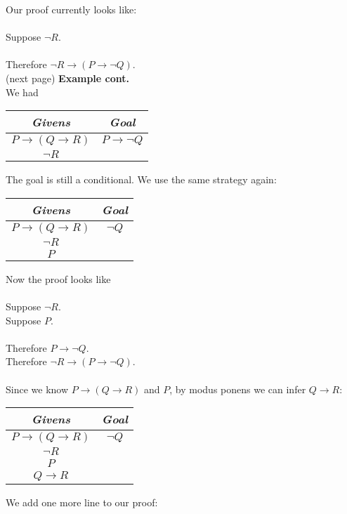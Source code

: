 \documentclass{report}
\begin{document}
Our proof currently looks like:\\
\vspace{1mm}\\
\indent Suppose $\neg R$.\\
\indent{}\\
\indent Therefore $\neg R\to(P\to\neg Q)$.\\
(next page)\newpage
\noindent\textbf{Example cont.}\\
We had
\begin{center}
\begin{tabular}{c|c}
\textit{Givens}&\textit{Goal}\\
\hline
$P\to(Q\to R)$&$P\to\neg Q$\\
$\neg R$&
\end{tabular}
\end{center}
The goal is still a conditional. We use the same strategy again:
\begin{center}
\begin{tabular}{c|c}
\textit{Givens}&\textit{Goal}\\
\hline
$P\to(Q\to R)$&$\neg Q$\\
$\neg R$&\\
$P$&
\end{tabular}
\end{center}
Now the proof looks like\\
\vspace{1mm}\\
\indent Suppose $\neg R$.\\
\indent\indent Suppose $P$.\\
\indent\indent{}\\
\indent\indent Therefore $P\to\neg Q$.\\
\indent Therefore $\neg R\to(P\to\neg Q)$.\\
\vspace{1mm}\\
Since we know $P\to(Q\to R)$ and $P$, by modus ponens we can infer $Q\to R$:
\begin{center}
\begin{tabular}{c|c}
\textit{Givens}&\textit{Goal}\\
\hline
$P\to(Q\to R)$&$\neg Q$\\
$\neg R$&\\
$P$&\\
$Q\to R$&
\end{tabular}
\end{center}
We add one more line to our proof:\\
\end{document}
